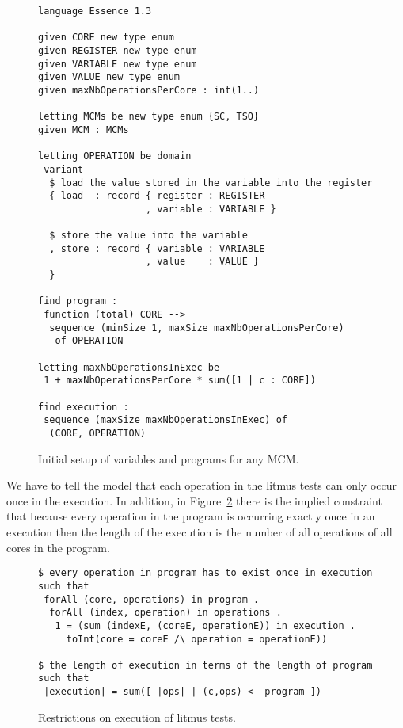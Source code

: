 \documentclass[runningheads]{llncs}
\begin{document}
\begin{figure}
\begin{lstlisting}
language Essence 1.3

given CORE new type enum
given REGISTER new type enum
given VARIABLE new type enum
given VALUE new type enum
given maxNbOperationsPerCore : int(1..)

letting MCMs be new type enum {SC, TSO}
given MCM : MCMs

letting OPERATION be domain
 variant
  $ load the value stored in the variable into the register
  { load  : record { register : REGISTER
                   , variable : VARIABLE }

  $ store the value into the variable
  , store : record { variable : VARIABLE
                   , value    : VALUE }
  }

find program :
 function (total) CORE -->
  sequence (minSize 1, maxSize maxNbOperationsPerCore)
   of OPERATION

letting maxNbOperationsInExec be
 1 + maxNbOperationsPerCore * sum([1 | c : CORE])

find execution :
 sequence (maxSize maxNbOperationsInExec) of
  (CORE, OPERATION)
\end{lstlisting}
\caption{Initial setup of variables and programs for any MCM.\label{fig:essence1}}
\end{figure}


We have to tell the model that each operation in the litmus tests can only occur once in the execution.
In addition, in Figure~\ref{fig:essence2} there is the implied constraint that because every operation in the program is occurring exactly once in an execution then the length of the execution is the number of all operations of all cores in the program.

\begin{figure}
\begin{lstlisting}
$ every operation in program has to exist once in execution
such that
 forAll (core, operations) in program .
  forAll (index, operation) in operations .
   1 = (sum (indexE, (coreE, operationE)) in execution .
     toInt(core = coreE /\ operation = operationE))

$ the length of execution in terms of the length of program
such that
 |execution| = sum([ |ops| | (c,ops) <- program ])
\end{lstlisting}
\caption{Restrictions on execution of litmus tests.\label{fig:essence2}}
\end{figure}
\end{document}
